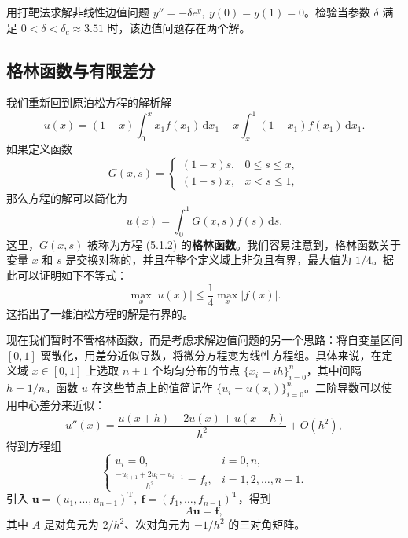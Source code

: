 \begin{exerciseBox}[练习 5.1]
用打靶法求解非线性边值问题 $y''=-\delta e^y,\ y(0)=y(1)=0$。检验当参数 $\delta$ 满足 $0<\delta<\delta_c\approx3.51$ 时，该边值问题存在两个解。
\end{exerciseBox}

\subsection{格林函数与有限差分}

我们重新回到原泊松方程的解析解
\begin{equation}
u(x)=(1-x)\int_0^x x_1f(x_1)\,\mathrm dx_1+x\int_x^1(1-x_1)f(x_1)\,\mathrm dx_1.
\tag{5.1.9}
\end{equation}
如果定义函数
\begin{equation}
G(x,s)=
\begin{cases}
(1-x)s,&0\le s\le x,\\
(1-s)x,&x<s\le1,
\end{cases}
\tag{5.1.10}
\end{equation}
那么方程的解可以简化为
\begin{equation}
u(x)=\int_0^1G(x,s)f(s)\,\mathrm ds.
\tag{5.1.11}
\end{equation}
这里，$G(x,s)$ 被称为方程 (5.1.2) 的\textbf{格林函数}。我们容易注意到，格林函数关于变量 $x$ 和 $s$ 是交换对称的，并且在整个定义域上非负且有界，最大值为 $1/4$。据此可以证明如下不等式：
\begin{equation}
\max_x|u(x)|\le\frac14\max_x|f(x)|.
\tag{5.1.12}
\end{equation}
这指出了一维泊松方程的解是有界的。

现在我们暂时不管格林函数，而是考虑求解边值问题的另一个思路：将自变量区间 $[0,1]$ 离散化，用差分近似导数，将微分方程变为线性方程组。具体来说，在定义域 $x\in[0,1]$ 上选取 $n+1$ 个均匀分布的节点 $\{x_i=ih\}_{i=0}^{n}$，其中间隔 $h=1/n$。函数 $u$ 在这些节点上的值简记作 $\{u_i=u(x_i)\}_{i=0}^{n}$。二阶导数可以使用中心差分来近似：
\begin{equation}
u''(x)=\frac{u(x+h)-2u(x)+u(x-h)}{h^2}+O(h^2),
\tag{5.1.13}
\end{equation}
得到方程组
\begin{equation}
\begin{cases}
u_i=0,&i=0,n,\\[3pt]
\displaystyle\frac{-u_{i+1}+2u_i-u_{i-1}}{h^2}=f_i,&i=1,2,\ldots,n-1.
\end{cases}
\tag{5.1.14}
\end{equation}
引入 $\bm u=(u_1,\ldots,u_{n-1})^{\mathrm T},\ \bm f=(f_1,\ldots,f_{n-1})^{\mathrm T}$，得到
\begin{equation}
A\bm u=\bm f,
\tag{5.1.15}
\end{equation}
其中 $A$ 是对角元为 $2/h^2$、次对角元为 $-1/h^2$ 的三对角矩阵。

